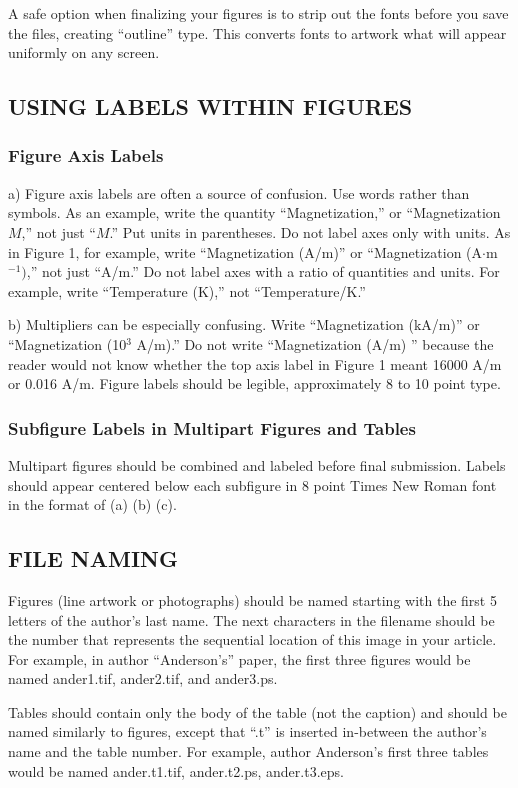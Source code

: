 \documentclass{ieeetj}
\begin{document}
A safe option when finalizing your figures is to strip out the fonts before
you save the files, creating ``outline'' type. This converts fonts to
artwork what will appear uniformly on any screen.

\subsection{USING LABELS WITHIN FIGURES}
\subsubsection{Figure Axis Labels}
a) Figure axis labels are often a source of confusion. Use words rather than
symbols. As an example, write the quantity ``Magnetization,'' or
``Magnetization $M$,'' not just ``$M$.'' Put units in parentheses. Do not label
axes only with units. As in Figure 1, for example, write ``Magnetization
(A/m)'' or ``Magnetization (A$\cdot $m$^{-1})$,'' not just ``A/m.'' Do not
label axes with a ratio of quantities and units. For example, write
``Temperature (K),'' not ``Temperature/K.''

b) Multipliers can be especially confusing. Write ``Magnetization (kA/m)'' or
``Magnetization (10$^{3}$ A/m).'' Do not write ``Magnetization (A/m)
'' because the reader would not know whether the top axis
label in Figure 1 meant 16000 A/m or 0.016 A/m. Figure labels should be
legible, approximately 8 to 10 point type.

\subsubsection{Subfigure Labels in Multipart Figures and Tables}
Multipart figures should be combined and labeled before final submission.
Labels should appear centered below each subfigure in 8 point Times New
Roman font in the format of (a) (b) (c).

\subsection{FILE NAMING}
Figures (line artwork or photographs) should be named starting with the
first 5 letters of the author's last name. The next characters in the
filename should be the number that represents the sequential location of
this image in your article. For example, in author ``Anderson's'' paper, the
first three figures would be named ander1.tif, ander2.tif, and ander3.ps.

Tables should contain only the body of the table (not the caption) and
should be named similarly to figures, except that ``.t'' is inserted
in-between the author's name and the table number. For example, author
Anderson's first three tables would be named ander.t1.tif, ander.t2.ps,
ander.t3.eps.
\end{document}
